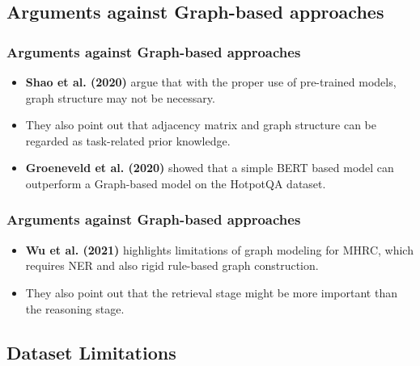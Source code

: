 \documentclass[10pt]{beamer}
\begin{document}
\subsection{Arguments against Graph-based approaches}

\begin{frame}
  \frametitle{Arguments against Graph-based approaches}
  \begin{itemize}
    \item \textbf{Shao et al. (2020)} \cite{RN127} argue that with the proper use of pre-trained models, graph structure may not be necessary. %
    \item They also point out that adjacency matrix and graph structure can be regarded as task-related prior knowledge. %
    \item \textbf{Groeneveld et al. (2020)} \cite{RN126} showed that a simple BERT based model can outperform a Graph-based model on the HotpotQA dataset.
  \end{itemize}

\end{frame}

\begin{frame}
  \frametitle{Arguments against Graph-based approaches}
  \begin{itemize}
    \item \textbf{Wu et al. (2021)} \cite{RN106} highlights limitations of graph modeling for MHRC, which requires NER and also rigid rule-based graph construction. %
    \item They also point out that the retrieval stage might be more important than the reasoning stage.
  \end{itemize}

\end{frame}

\subsection{Dataset Limitations}
\end{document}
